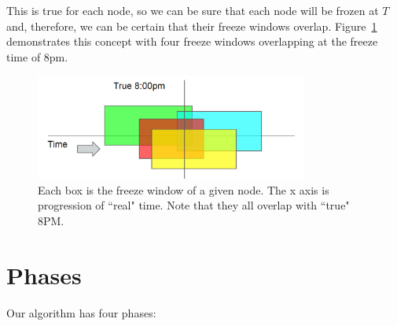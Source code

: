 This is true for each node, so we can be sure that each node will be
frozen at $T$ and, therefore, we can be certain that their freeze
windows overlap.  Figure~\ref{fig:overlapping-windows} demonstrates
this concept with four freeze windows overlapping at the freeze time
of 8pm.

\begin{figure}[!htbp]
  \centering
  \caption{ Each box is the freeze window of a given node. The x axis is progression of ``real" time. Note that they all overlap with ``true" 8PM.}
  \label{fig:overlapping-windows}
  \includegraphics[width=0.8\textwidth]{overlapping-windows.png}
\end{figure}


\section{Phases}
Our algorithm has four phases:

